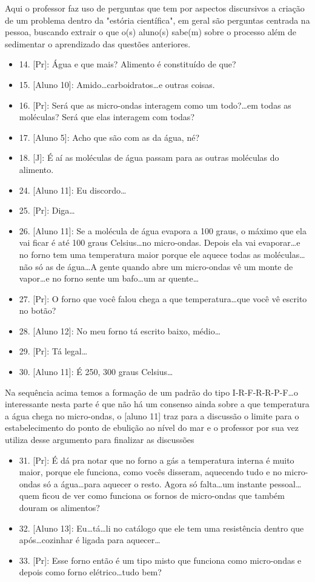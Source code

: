 Aqui o professor faz uso de perguntas que tem por aspectos discursivos a criação de um problema dentro da "estória científica", em geral são perguntas centrada na pessoa, buscando extrair o que o(s) aluno(s) sabe(m) sobre o processo além de sedimentar o aprendizado das questões anteriores.
\begin{itemize}
    \item 14. [Pr]: Água e que mais? Alimento é constituído de que? 
    \item 15. [Aluno 10]: Amido\ldots carboidratos\ldots e outras coisas.
    \item 16. [Pr]: Será que as micro-ondas interagem como um todo?\ldots em todas as moléculas? Será que elas interagem com todas?
    \item 17. [Aluno 5]: Acho que são com as da água, né?
    \item 18. [J]: É aí as moléculas de água passam para as outras moléculas do alimento.
    \item 24. [Aluno 11]: Eu discordo\ldots
    \item 25. [Pr]: Diga\ldots
    \item 26. [Aluno 11]: Se a molécula de água evapora a 100 graus, o máximo que ela vai ficar é até 100 graus Celsius\ldots no micro-ondas. Depois ela vai evaporar\ldots e no forno tem uma temperatura maior porque ele aquece todas as moléculas\ldots não só as de água\ldots A gente quando abre um micro-ondas vê um monte de vapor\ldots e no forno sente um bafo\ldots um ar quente\ldots
    \item 27. [Pr]: O forno que você falou chega a que temperatura\ldots que você vê escrito no botão?
    \item 28. [Aluno 12]: No meu forno tá escrito baixo, médio\ldots
    \item 29. [Pr]: Tá legal\ldots
    \item 30. [Aluno 11]: É 250, 300 graus Celsius\ldots    
\end{itemize}
Na sequência acima temos a formação de um padrão do tipo I-R-F-R-R-P-F\ldots o interessante nesta parte é que não há um consenso ainda sobre a que temperatura a água chega no micro-ondas, o [aluno 11] traz para a discussão o limite para o estabelecimento do ponto de ebulição ao nível do mar e o professor por sua vez utiliza desse argumento para finalizar as discussões
\begin{itemize}
    \item 31. [Pr]: É dá pra notar que no forno a gás a temperatura interna é muito maior, porque ele funciona, como vocês disseram, aquecendo tudo e no micro-ondas só a água\ldots para aquecer o resto. Agora só falta\ldots um instante pessoal\ldots quem ficou de ver como funciona os fornos de micro-ondas que também douram os alimentos?
    \item 32. [Aluno 13]: Eu\ldots tá\ldots li no catálogo que ele tem uma resistência dentro que após\ldots cozinhar é ligada para aquecer\ldots
    \item 33. [Pr]: Esse forno então é um tipo misto que funciona como micro-ondas e depois como forno elétrico\ldots tudo bem?
\end{itemize}
